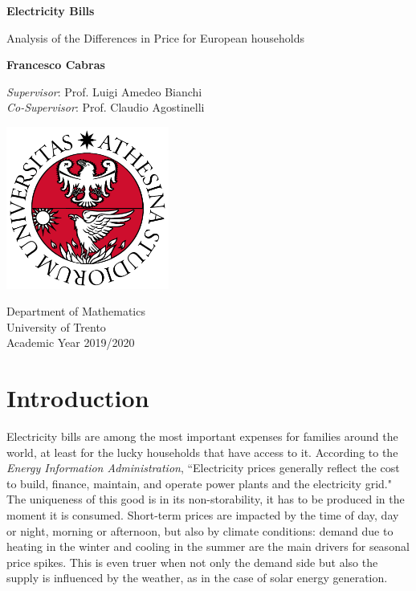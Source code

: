 \documentclass[a4paper,12pt]{book}
\begin{document}
\frontmatter
\begin{titlepage}
    \begin{center}
        \vspace*{1cm}
            
        \LARGE
        \textbf{Electricity Bills}
            
        \vspace{0.5cm}
        \large
        Analysis of the Differences in Price for European households
            
        \vspace{1.5cm}
            
        \textbf{Francesco Cabras}
            
        \vfill
        \textit{Supervisor}: Prof. Luigi Amedeo Bianchi\\
        \textit{Co-Supervisor}: Prof. Claudio Agostinelli
            
        \vspace{1.5cm}
            
        \includegraphics[width=0.4\textwidth]{Images/uni}
         
        Department of Mathematics\\
        University of Trento\\
        Academic Year 2019/2020
            
    \end{center}
\end{titlepage}

\tableofcontents

\mainmatter
\chapter{Introduction}

Electricity bills are among the most important expenses for families around the world, at least for the lucky households that have access to it. According to the \textit{Energy Information Administration}, ``Electricity prices generally reflect the cost to build, finance, maintain, and operate power plants and the electricity grid." The uniqueness of this good is in its non-storability, it has to be produced in the moment it is consumed. Short-term prices are impacted by the time of day, day or night, morning or afternoon, but also by climate conditions: demand due to heating in the winter and cooling in the summer are the main drivers for seasonal price spikes. This is even truer when not only the demand side but also the supply is influenced by the weather, as in the case of solar energy generation.
\end{document}
